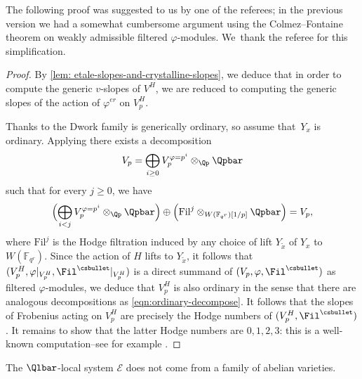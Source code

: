 The following proof was suggested to us by one of the referees; in the previous version we had a somewhat cumbersome argument using the Colmez--Fontaine theorem on weakly admissible filtered $\varphi$-modules. We~thank the referee for this simplification.

\begin{proof}
By \cref{lem: etale-slopes-and-crystalline-slopes}, we deduce that in order to compute the generic $v$-slopes of $V^H$, we are reduced to computing the generic slopes of the action of $\varphi^{er}$ on $V_p^H$.

Thanks to \cite[Th.\,2.2]{Yu-Variation-of-the-Unit-Root-Along-the-Dwork-Family-of-Calabi-Yau-Varieties} the Dwork family is generically ordinary, so assume that~$Y_x$ is ordinary. Applying \cite[Prop.\,1.3.2]{Deligne-Cristaux-ordinaires-et-coordonnees-canoniques} there exists a decomposition
\[
V_p=\bigoplus_{i\geq 0}V_p^{\varphi=p^i}\otimes_{\Qp}\Qpbar
\]
such that for every $j\geq 0$, we have
\begin{equation}\label{eqn:ordinary-decompose} \Bigl(\bigoplus_{i<j}V_p^{\varphi=p^i}\otimes_{\Qp}\Qpbar\Bigr)\oplus\Bigl(\mathrm{Fil}^j\otimes_{W(\mathbb{F}_{q^r})[1/p]}\Qpbar\Bigr)=V_p,
\end{equation}
where $\mathrm{Fil}^j$ is the Hodge filtration induced by any choice of lift $Y_{\tilde{x}}$ of $Y_x$ to $W(\mathbb{F}_{q^r})$. Since the action of $H$ lifts to $Y_{\tilde{x}}$, it follows that $(V_p^H, \varphi|_{V_{p}^H}, \Fil^{\csbullet}|_{V_{p}^H})$ is a direct summand of $(V_p, \varphi, \Fil^{\csbullet})$ as filtered $\varphi$-modules, we deduce that $V_p^H$ is also ordinary in the sense that there are analogous decompositions as \eqref{eqn:ordinary-decompose}. It follows that the slopes of Frobenius acting on $V_p^H$ are precisely the Hodge numbers of $(V_p^H, \Fil^{\csbullet})$. It remains to show that the latter Hodge numbers are $0,1,2,3$: this is a well-known computation--see for example \cite[Lem.\,1.5]{Harris-Shepherd-Barron-Taylor-A-Family-of-Calabi-Yau-Varieties-and-Potential-Automorphy}.
\end{proof}

\begin{prop}\label{prop: F-isoc-of-Dwork-family-does-not-come-from-ab-var}
The $\Qlbar$-local system $\mathcal{E}$ does not come from a family of abelian varieties.
\end{prop}

